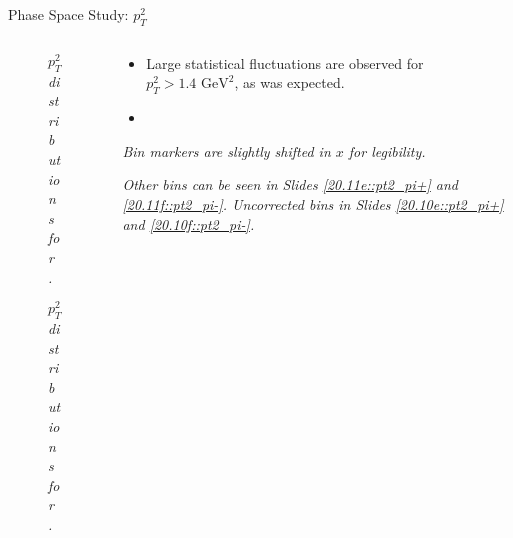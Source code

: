 \begin{frame}{Phase Space Study: $p_T^2$}
    \label{12.15::pt2}

    \begin{columns}[onlytextwidth,T]

    \begin{column}{.44\linewidth}
        \vspace{-15pt}
        \begin{center}
            \begin{figure}[t]
                \scriptsize{\textit{$p_T^2$ distributions for \ef{$\pi^-$}.}}
            \end{figure}

            \vspace{-15pt}
            \begin{figure}[t]
                \scriptsize{\textit{$p_T^2$ distributions for \ef{$\pi^+$}.}}
            \end{figure}
        \end{center}
    \end{column}

    \begin{column}{.54\linewidth}
        \begin{itemize}
            \item
                Large statistical fluctuations are observed for $p_T^2 > 1.4 \text{ GeV}^2$, as was expected.

            \vspace{12pt}
            \item
        \end{itemize}

        \vspace{109pt}

        \begin{flushright}
            \tiny{\textit{Bin markers are slightly shifted in $x$ for legibility.}}

            \vspace{-0.5pt}

            \tiny{\textit{
                Other bins can be seen in Slides \textcolor{efd_purple}{\ref{20.11e::pt2_pi+}} and \textcolor{efd_purple}{\ref{20.11f::pt2_pi-}}.
                Uncorrected bins in Slides \textcolor{efd_purple}{\ref{20.10e::pt2_pi+}} and \textcolor{efd_purple}{\ref{20.10f::pt2_pi-}}.
            }}
        \end{flushright}
    \end{column}

    \end{columns}
\end{frame}


